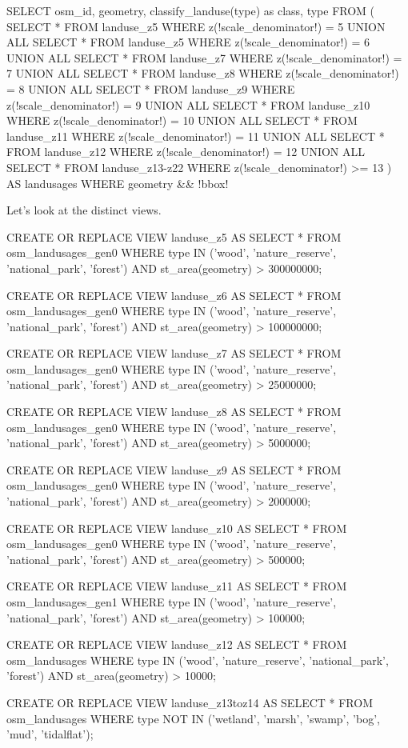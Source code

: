 \begin{sqlcode}
SELECT osm_id, geometry, classify_landuse(type) as class, type
FROM (
  SELECT * FROM landuse_z5 WHERE z(!scale_denominator!) = 5
  UNION ALL
  SELECT * FROM landuse_z5 WHERE z(!scale_denominator!) = 6
  UNION ALL
  SELECT * FROM landuse_z7 WHERE z(!scale_denominator!) = 7
  UNION ALL
  SELECT * FROM landuse_z8 WHERE z(!scale_denominator!) = 8
  UNION ALL
  SELECT * FROM landuse_z9 WHERE z(!scale_denominator!) = 9
  UNION ALL
  SELECT * FROM landuse_z10 WHERE z(!scale_denominator!) = 10
  UNION ALL
  SELECT * FROM landuse_z11 WHERE z(!scale_denominator!) = 11
  UNION ALL
  SELECT * FROM landuse_z12 WHERE z(!scale_denominator!) = 12
  UNION ALL
  SELECT * FROM landuse_z13-z22 WHERE z(!scale_denominator!) >= 13
) AS landusages
WHERE geometry && !bbox!
\end{sqlcode}

Let's look at the distinct views.

\begin{sqlcode}
CREATE OR REPLACE VIEW landuse_z5 AS
    SELECT *
    FROM osm_landusages_gen0
    WHERE type IN ('wood', 'nature_reserve', 'national_park', 'forest')
      AND st_area(geometry) > 300000000;

CREATE OR REPLACE VIEW landuse_z6 AS
    SELECT *
    FROM osm_landusages_gen0
    WHERE type IN ('wood', 'nature_reserve', 'national_park', 'forest')
      AND st_area(geometry) > 100000000;

CREATE OR REPLACE VIEW landuse_z7 AS
    SELECT *
    FROM osm_landusages_gen0
    WHERE type IN ('wood', 'nature_reserve', 'national_park', 'forest')
      AND st_area(geometry) > 25000000;

CREATE OR REPLACE VIEW landuse_z8 AS
    SELECT *
    FROM osm_landusages_gen0
    WHERE type IN ('wood', 'nature_reserve', 'national_park', 'forest')
      AND st_area(geometry) > 5000000;

CREATE OR REPLACE VIEW landuse_z9 AS
    SELECT *
    FROM osm_landusages_gen0
    WHERE type IN ('wood', 'nature_reserve', 'national_park', 'forest')
      AND st_area(geometry) > 2000000;

CREATE OR REPLACE VIEW landuse_z10 AS
    SELECT *
    FROM osm_landusages_gen0
    WHERE type IN ('wood', 'nature_reserve', 'national_park', 'forest')
      AND st_area(geometry) > 500000;

CREATE OR REPLACE VIEW landuse_z11 AS
    SELECT *
    FROM osm_landusages_gen1
    WHERE type IN ('wood', 'nature_reserve', 'national_park', 'forest')
      AND st_area(geometry) > 100000;

CREATE OR REPLACE VIEW landuse_z12 AS
    SELECT *
    FROM osm_landusages
    WHERE type IN ('wood', 'nature_reserve', 'national_park', 'forest')
      AND st_area(geometry) > 10000;

CREATE OR REPLACE VIEW landuse_z13toz14 AS
    SELECT *
    FROM osm_landusages
    WHERE type NOT IN ('wetland', 'marsh', 'swamp', 'bog', 'mud', 'tidalflat');
\end{sqlcode}

